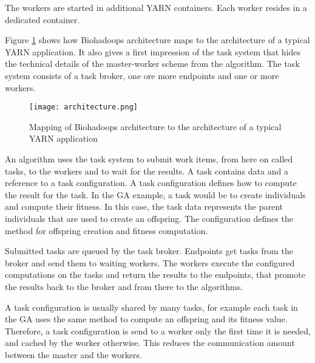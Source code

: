 The workers are started in additional YARN containers. Each worker resides in a dedicated container.

Figure \ref{fig:architecture} shows how Biohadoops architecture maps to the architecture of a typical YARN application. It also gives a first impression of the task system that hides the technical details of the master-worker scheme from the algorithm. The task system consists of a task broker, one ore more endpoints and one or more workers.

\begin{figure}
  \centering
  \texttt{[image: architecture.png]}
  \caption[Mapping of Biohadoops architecture to the architecture of a typical YARN application]{Mapping of Biohadoops architecture to the architecture of a typical YARN application}
  \label{fig:architecture}
\end{figure}

An algorithm uses the task system to submit work items, from here on called tasks, to the workers and to wait for the results. A task contains data and a reference to a task configuration. A task configuration defines how to compute the result for the task. In the GA example, a task would be to create individuals and compute their fitness. In this case, the task data represents the parent individuals that are used to create an offspring. The configuration defines the method for offspring creation and fitness computation.

Submitted tasks are queued by the task broker. Endpoints get tasks from the broker and send them to waiting workers. The workers execute the configured computations on the tasks and return the results to the endpoints, that promote the results back to the broker and from there to the algorithms.

A task configuration is usually shared by many tasks, for example each task in the GA uses the same method to compute an offspring and its fitness value. Therefore, a task configuration is send to a worker only the first time it is needed, and cached by the worker otherwise. This reduces the communication amount between the master and the workers.

